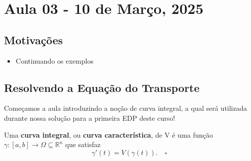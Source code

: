\documentclass[../pde_notes.tex]{subfiles}
\begin{document}
\section{Aula 03 - 10 de Março, 2025}
\subsection{Motivações}
\begin{itemize}
	\item Continuando os exemplos
\end{itemize}
\subsection{Resolvendo a Equação do Transporte}
Começamos a aula introduzindo a noção de curva integral, a qual será utilizada durante nossa solução para a primeira EDP deste curso!
\begin{def*}
	Uma \textbf{curva integral}, ou \textbf{curva característica}, de V é uma função \(\gamma :[a, b]\rightarrow \Omega \subseteq \mathbb{R}^{n}\) que satisfaz
	\[
		\gamma'(t) = V(\gamma (t)).\quad \square
	\]
\end{def*}
\end{document}
